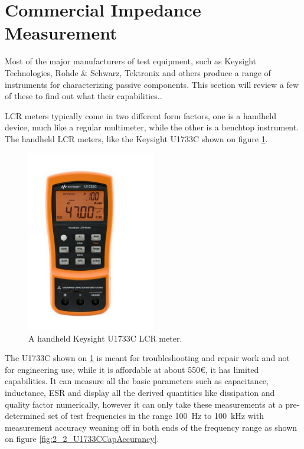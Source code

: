 \section{Commercial Impedance Measurement} \label{sec:CommercialImpedanceMeasurement}
Most of the major manufacturers of test equipment, such as Keysight Technologies, Rohde \& Schwarz, Tektronix and others produce a range of instruments for characterizing passive components. This section will review a few of these to find out what their capabilities.. 

LCR meters typically come in two different form factors, one is a handheld device, much like a regular multimeter, while the other is a benchtop instrument. The handheld LCR meters, like the Keysight U1733C\cite{KeysightU1733C} shown on figure \ref{fig:2_2_U1733C}.
\begin{figure}[H]
    \centering
    \includegraphics[clip, trim=0 50 0 50, width=0.5\textwidth]{Sections/2_ProblemAnalysis/FIgures/KeysightU1733C.pdf}
    \caption{A handheld Keysight U1733C LCR meter.\cite{KeysightU1733C}}
    \label{fig:2_2_U1733C}
\end{figure}
The U1733C shown on \ref{fig:2_2_U1733C} is meant for troubleshooting and repair work and not for engineering use, while it is affordable at about 550€, it has limited capabilities. It can measure all the basic parameters such as capacitance, inductance, ESR and display all the derived quantities like dissipation and quality factor numerically, however it can only take these measurements at a pre-determined set of test frequencies in the range \SI[]{100}{\hertz} to \SI[]{100}{\kilo\hertz} with measurement accuracy weaning off in both ends of the frequency range as shown on figure \ref{fig:2_2_U1733CCapAccurancy}.

